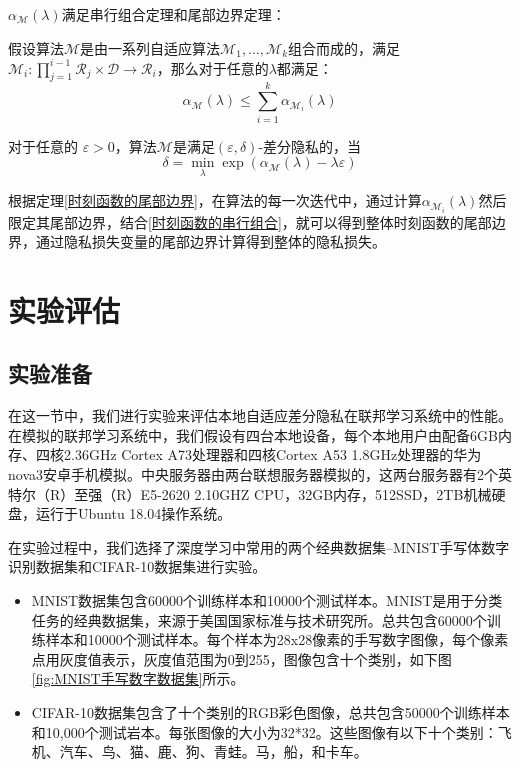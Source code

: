 $\alpha_{\mathcal{M}}(\lambda)$满足串行组合定理和尾部边界定理：

\begin{theorem}[时刻函数的串行组合]\label{时刻函数的串行组合}
假设算法$\mathcal{M}$是由一系列自适应算法$\mathcal{M}_{1}, \ldots, \mathcal{M}_{k}$组合而成的，满足$\mathcal{M}_{i}: \prod_{j=1}^{i-1} \mathcal{R}_{j} \times \mathcal{D} \rightarrow \mathcal{R}_{i}$，那么对于任意的$\lambda$都满足：
$$
\alpha_{\mathcal{M}}(\lambda) \leq \sum_{i=1}^{k} \alpha_{\mathcal{M}_{i}}(\lambda)
$$
\end{theorem}

\begin{theorem}[时刻函数的尾部边界]\label{时刻函数的尾部边界}
对于任意的 $\varepsilon>0$，算法$\mathcal{M}$是满足$(\varepsilon, \delta)$-差分隐私的，当
$$
\delta=\min _{\lambda} \exp \left(\alpha_{\mathcal{M}}(\lambda)-\lambda \varepsilon\right)
$$
\end{theorem}

根据定理\ref{时刻函数的尾部边界}，在算法的每一次迭代中，通过计算$\alpha_{\mathcal{M}_{i}}(\lambda)$然后限定其尾部边界，结合\ref{时刻函数的串行组合}，就可以得到整体时刻函数的尾部边界，通过隐私损失变量的尾部边界计算得到整体的隐私损失。


\section{实验评估}
\subsection{实验准备}
在这一节中，我们进行实验来评估本地自适应差分隐私在联邦学习系统中的性能。在模拟的联邦学习系统中，我们假设有四台本地设备，每个本地用户由配备6GB内存、四核2.36GHz Cortex A73处理器和四核Cortex A53 1.8GHz处理器的华为nova3安卓手机模拟。中央服务器由两台联想服务器模拟的，这两台服务器有2个英特尔（R）至强（R）E5-2620 2.10GHZ CPU，32GB内存，512SSD，2TB机械硬盘，运行于Ubuntu 18.04操作系统。

在实验过程中，我们选择了深度学习中常用的两个经典数据集--MNIST手写体数字识别数据集和CIFAR-10数据集进行实验。
\begin{itemize}
\item MNIST数据集包含60000个训练样本和10000个测试样本。MNIST是用于分类任务的经典数据集，来源于美国国家标准与技术研究所。总共包含60000个训练样本和10000个测试样本。每个样本为28x28像素的手写数字图像，每个像素点用灰度值表示，灰度值范围为0到255，图像包含十个类别，如下图\ref{fig:MNIST手写数字数据集}所示。

\item CIFAR-10数据集包含了十个类别的RGB彩色图像，总共包含50000个训练样本和10,000个测试岩本。每张图像的大小为32*32。这些图像有以下十个类别：飞机、汽车、鸟、猫、鹿、狗、青蛙。马，船，和卡车。

\end{itemize}


